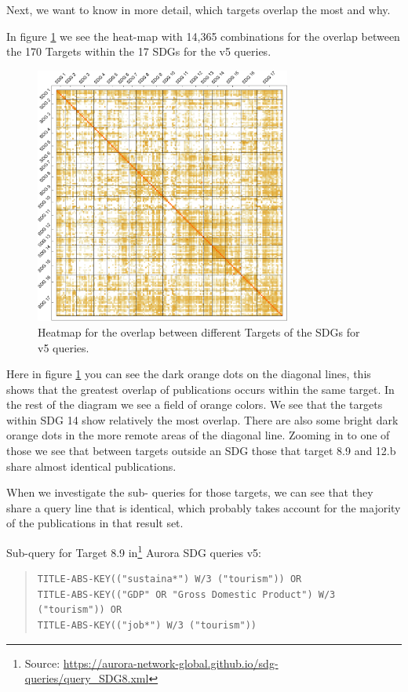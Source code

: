 \documentclass{article}
\begin{document}
Next, we want to know in more detail, which targets overlap the most and why.

In  figure \ref{heatmapoverlapv5subqueries} we see the heat-map with 14,365 combinations for the overlap between the 170 Targets within the 17 SDGs for the v5 queries. 

\begin{figure}[H]
	\centering
  \includegraphics[width=0.75\textwidth]{figures/overlap_per_subquery.pdf}
	\caption{Heatmap for the overlap between different Targets of the SDGs for v5 queries.}
	\label{heatmapoverlapv5subqueries}
\end{figure}

Here in figure \ref{heatmapoverlapv5subqueries} you can see the dark orange dots on the diagonal lines, this shows that the greatest overlap of publications occurs within the same target. In the rest of the diagram we see a field of orange colors. We see that the targets within SDG 14 show relatively the most overlap. There are also some bright dark orange dots in the more remote areas of the diagonal line. Zooming in to one of those we see that between targets outside an SDG those that target 8.9 and 12.b share almost identical publications.

When we investigate the sub- queries for those targets, we can see that they share a query line that is identical, which probably takes account for the majority of the publications in that result set.

Sub-query for Target 8.9 in\footnote{ Source: \url{https://aurora-network-global.github.io/sdg-queries/query_SDG8.xml}} Aurora SDG queries v5: 
\begin{quote}
\begin{verbatim}
TITLE-ABS-KEY(("sustaina*") W/3 ("tourism")) OR 
TITLE-ABS-KEY(("GDP" OR "Gross Domestic Product") W/3 ("tourism")) OR 
TITLE-ABS-KEY(("job*") W/3 ("tourism"))
\end{verbatim}
\end{quote}
\end{document}
